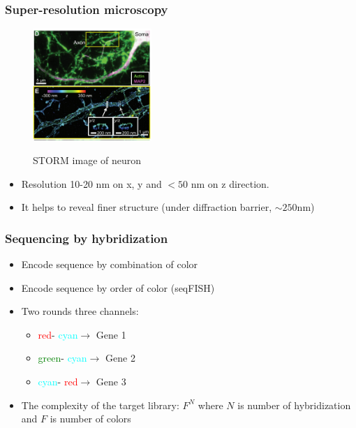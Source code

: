 \documentclass{beamer}
\newcommand{\red}{\textcolor{red}{red}}
\newcommand{\green}{\textcolor{green}{green}}
\newcommand{\cyan}{\textcolor{cyan}{cyan}}
\begin{document}
  \begin{frame}
  \frametitle{Super-resolution microscopy}
  \begin{figure}
    \centering
    \includegraphics[width=0.4\textwidth]{storm}
    \caption{STORM image of neuron} \cite{xu2013actin}
  \end{figure}
  \begin{itemize}
    \item Resolution 10-20 nm on x, y and $<50$ nm on z direction.
    \item It helps to reveal finer structure (under diffraction barrier, $\sim 250$nm)
  \end{itemize}
  \end{frame}

  \begin{frame}
  \frametitle{Sequencing by hybridization}

  \begin{itemize}
    \item Encode sequence by combination of color \cite{lubeck2012single}
    \item Encode sequence by order of color \cite{lubeck2014single} (seqFISH)
    \item Two rounds three channels:
      \begin{itemize}
        \item \red - \cyan $\rightarrow$ Gene 1
        \item \green - \cyan $\rightarrow$ Gene 2
        \item \cyan - \red $\rightarrow$ Gene 3
      \end{itemize}
    \item The complexity of the target library: $F^N$ where $N$ is number of hybridization and $F$ is number of colors
  \end{itemize}
  \end{frame}
\end{document}
